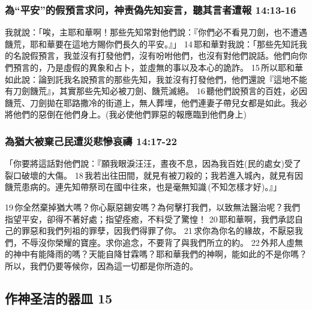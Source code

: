 \subsubsection{為“平安”的假預言求问，神责偽先知妄言，聽其言者遭報 14:13-16}
我就說：「唉，主耶和華啊！那些先知常對他們說：『你們必不看見刀劍，也不遭遇饑荒，耶和華要在這地方賜你們長久的平安。』」 
14 耶和華對我說：「那些先知託我的名說假預言，我並沒有打發他們，沒有吩咐他們，也沒有對他們說話。他們向你們預言的，乃是虛假的異象和占卜，並虛無的事以及本心的詭詐。 
15 所以耶和華如此說：論到託我名說預言的那些先知，我並沒有打發他們，他們還說『這地不能有刀劍饑荒』，其實那些先知必被刀劍、饑荒滅絕。 16 聽他們說預言的百姓，必因饑荒、刀劍拋在耶路撒冷的街道上，無人葬埋，他們連妻子帶兒女都是如此。我必將他們的惡倒在他們身上。(我必使他們罪惡的報應臨到他們身上)

\subsubsection{為猶大被棄己民遭災悲慘哀禱 14:17-22}
「你要將這話對他們說：『願我眼淚汪汪，晝夜不息，因為我百姓(民的處女)受了裂口破壞的大傷。 18 我若出往田間，就見有被刀殺的；我若進入城內，就見有因饑荒患病的。連先知帶祭司在國中往來，也是毫無知識 (不知怎樣才好)。』」

19 你全然棄掉猶大嗎？你心厭惡錫安嗎？為何擊打我們，以致無法醫治呢？我們指望平安，卻得不著好處；指望痊癒，不料受了驚惶！ 20 耶和華啊，我們承認自己的罪惡和我們列祖的罪孽，因我們得罪了你。 21 求你為你名的緣故，不厭惡我們，不辱沒你榮耀的寶座。求你追念，不要背了與我們所立的約。 22 外邦人虛無的神中有能降雨的嗎？天能自降甘霖嗎？耶和華我們的神啊，能如此的不是你嗎？所以，我們仍要等候你，因為這一切都是你所造的。




\subsection{作神圣洁的器皿 15}
